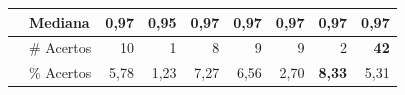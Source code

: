 \begin{quadro}[h]
{\begin{tabular}{l|l|r|r|r|r|r|r|r|}
\multicolumn{1}{|c|}{}                                                                                   & Mediana       & \textbf{0,97}                      & 0,95                       & \textbf{0,97}                          & \textbf{0,97}                       & \textbf{0,97}                          & \textbf{0,97}                        & \textbf{0,97}                       \\ \hline
\multicolumn{1}{l|}{\textbf{}}                                                                           & \# Acertos    & 10                          & 1                            & 8                               & 9                            & 9                               & 2                             & \textbf{42}                            \\ \cline{2-9} 
\multicolumn{1}{l|}{\textbf{}}                                                                           & \% Acertos & 5,78                      & 1,23                       & 7,27                          & 6,56                       & 2,70                          & \textbf{8,33}                        & 5,31                       \\ \cline{2-9} 
\end{tabular}}
\end{quadro}


